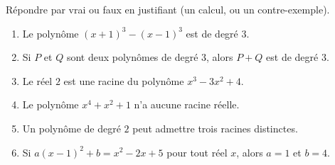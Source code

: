 
\newcommand{\R}{\mathbb{R}}
\newcommand{\vect}[1]{\overrightarrow{#1}}

Répondre par vrai ou faux en justifiant (un calcul, ou un contre-exemple).
\begin{enumerate}
  \item Le polynôme $(x+1)^3-(x-1)^3$ est de degré $3$.
  \item Si $P$ et $Q$ sont deux polynômes de degré $3$, alors $P+Q$ est de degré $3$.
  \item Le réel $2$ est une racine du polynôme $x^3-3x^2+4$.
  \item Le polynôme $x^4+x^2+1$ n'a aucune racine réelle.
  \item Un polynôme de degré $2$ peut admettre trois racines distinctes.
  \item Si $a(x-1)^2+b=x^2-2x+5$ pour tout réel $x$, alors $a=1$ et $b=4$.
\end{enumerate}

